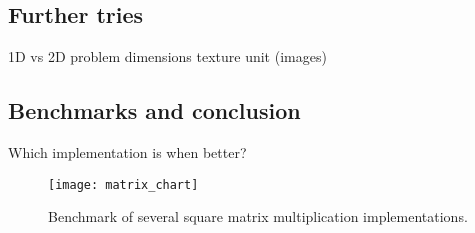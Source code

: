 \subsection{Further tries}
1D vs 2D problem dimensions
texture unit (images)


\subsection{Benchmarks and conclusion}
Which implementation is when better?


\begin{figure}
	\centering
	\texttt{[image: matrix\_chart]}
	\caption{Benchmark of several square matrix multiplication implementations.}
	\label{fig:matrix_chart}
\end{figure}

